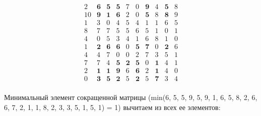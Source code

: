 \documentclass[17pt]{extarticle}
\begin{document}
\[
    \begin{array}{*{10}{c}}
        2  & \textbf{6} & \textbf{5} & \textbf{5} & 7          & 0          & \textbf{9} & 4          & \textbf{5} & 8 \\
        10 & \textbf{9} & \textbf{1} & \textbf{6} & 2          & 0          & \textbf{5} & 8          & \textbf{8} & 9 \\
        1  & 3          & 0          & 4          & 5          & 4          & 1          & 1          & 6          & 5 \\
        8  & 7          & 7          & 5          & 5          & 6          & 5          & 1          & 0          & 1 \\
        4  & 0          & 5          & 3          & 4          & 1          & 6          & 8          & 1          & 0 \\
        1  & \textbf{2} & \textbf{6} & \textbf{6} & 0          & \textbf{5} & \textbf{7} & 0          & \textbf{2} & 6 \\
        4  & 4          & 7          & 0          & 0          & 2          & 7          & 3          & 5          & 1 \\
        7  & 7          & 4          & \textbf{5} & \textbf{2} & \textbf{5} & 0          & \textbf{1} & 4          & 1 \\
        2  & \textbf{1} & \textbf{1} & \textbf{9} & 6          & \textbf{6} & 2          & \textbf{1} & 4          & 0 \\
        0  & \textbf{3} & \textbf{5} & \textbf{2} & 5          & \textbf{2} & 5          & \textbf{7} & 3          & 4 \\
    \end{array}
\]

Минимальный элемент сокращенной матрицы (min(6, 5, 5, 9, 5, 9, 1, 6, 5, 8, 2, 6, 6, 7, 2, 1, 1, 8, 2, 3, 3, 5, 1, 5, 1) = 1) вычитаем из всех ее элементов:
\end{document}
